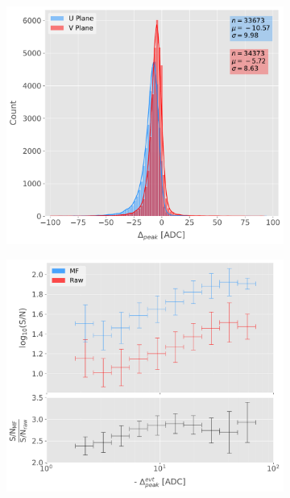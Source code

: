\begin{figure}[t]
	\begin{subfigure}{0.5\textwidth}
		\centering
		\includegraphics[width=.99\linewidth]{Images/Matched_Filter/deltaPeak_dist}
	\end{subfigure}
	\begin{subfigure}{0.5\textwidth}
		\centering
		\includegraphics[width=.99\linewidth]{Images/Matched_Filter/deltaPeak_SN_ratio}
	\end{subfigure}

\end{figure}
